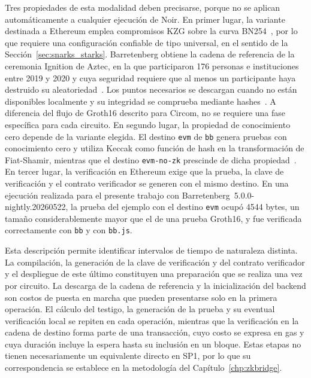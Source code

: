 Tres propiedades de esta modalidad deben precisarse, porque no se aplican automáticamente a
cualquier ejecución de Noir. En primer lugar, la variante destinada a Ethereum emplea compromisos
KZG sobre la curva BN254~\cite{barretenbergsrc}, por lo que requiere una configuración confiable
de tipo universal, en el sentido de la Sección~\ref{sec:snarks_starks}. Barretenberg obtiene la
cadena de referencia de la ceremonia Ignition de Aztec, en la que participaron 176 personas e
instituciones entre 2019 y 2020 y cuya seguridad requiere que al menos un participante haya
destruido su aleatoriedad~\cite{ignition2020}. Los puntos necesarios se descargan cuando no están
disponibles localmente y su integridad se comprueba mediante hashes~\cite{barretenbergsrc}. A
diferencia del flujo de Groth16 descrito para Circom, no se requiere una fase específica para cada
circuito. En segundo lugar, la propiedad de conocimiento cero depende de la variante elegida. El
destino \lstinline|evm| de \texttt{bb} genera pruebas con conocimiento cero y utiliza Keccak como
función de hash en la transformación de Fiat-Shamir, mientras que el destino
\lstinline|evm-no-zk| prescinde de dicha propiedad~\cite{barretenbergsrc}. En tercer lugar, la
verificación en Ethereum exige que la prueba, la clave de verificación y el contrato verificador
se generen con el mismo destino. En una ejecución realizada para el presente trabajo con
Barretenberg~5.0.0-nightly.20260522, la prueba del ejemplo con el destino \lstinline|evm| ocupó
4544 bytes, un tamaño considerablemente mayor que el de una prueba Groth16, y fue verificada
correctamente con \texttt{bb} y con \texttt{bb.js}.

Esta descripción permite identificar intervalos de tiempo de naturaleza distinta. La
compilación, la generación de la clave de verificación y del contrato verificador y el
despliegue de este último constituyen una preparación que se realiza una vez por circuito. La
descarga de la cadena de referencia y la inicialización del backend son costos de puesta en
marcha que pueden presentarse solo en la primera operación. El cálculo del testigo, la generación
de la prueba y su eventual verificación local se repiten en cada operación, mientras que la
verificación en la cadena de destino forma parte de una transacción, cuyo costo se expresa en gas
y cuya duración incluye la espera hasta su inclusión en un bloque. Estas etapas no tienen
necesariamente un equivalente directo en SP1, por lo que su correspondencia se establece en la
metodología del Capítulo~\ref{chp:zkbridge}.

